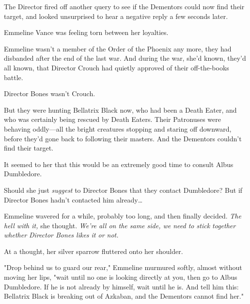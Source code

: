 The Director fired off another query to see if the Dementors could now find 
their target, and looked unsurprised to hear a negative reply a few seconds 
later.

Emmeline Vance was feeling torn between her loyalties.

Emmeline wasn't a member of the Order of the Phoenix any more, they had 
disbanded after the end of the last war. And during the war, she'd known, 
they'd all known, that Director Crouch had quietly approved of their 
off-the-books battle.

Director Bones wasn't Crouch.

But they were hunting Bellatrix Black now, who had been a Death Eater, and who 
was certainly being rescued by Death Eaters. Their Patronuses were behaving 
oddly---all the bright creatures stopping and staring off downward, before 
they'd gone back to following their masters. And the Dementors couldn't find 
their target.

It seemed to her that this would be an extremely good time to consult Albus 
Dumbledore.

Should she just \emph{suggest} to Director Bones that they contact Dumbledore? 
But if Director Bones hadn't contacted him already{\ldots}

Emmeline wavered for a while, probably too long, and then finally decided. 
\emph{The hell with it,} she thought. \emph{We're all on the same side, we need 
to stick together whether Director Bones likes it or not.}

At a thought, her silver sparrow fluttered onto her shoulder.

"Drop behind us to guard our rear," Emmeline murmured softly, almost without 
moving her lips, "wait until no one is looking directly at you, then go to 
Albus Dumbledore. If he is not already by himself, wait until he is. And tell 
him this: Bellatrix Black is breaking out of Azkaban, and the Dementors cannot 
find her."